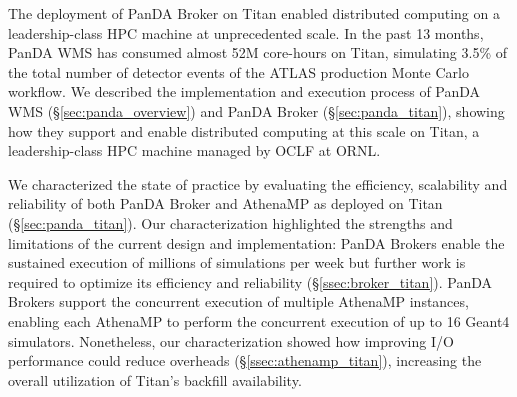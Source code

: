 
The deployment of PanDA Broker on Titan enabled distributed computing on a
leadership-class HPC machine at unprecedented scale. In the past 13 months,
PanDA WMS has consumed almost 52M core-hours on Titan, simulating 3.5\% of the
total number of detector events of the ATLAS production Monte Carlo workflow. We
described the implementation and execution process of PanDA WMS
(\S\ref{sec:panda_overview}) and PanDA Broker (\S\ref{sec:panda_titan}), showing
how they support and enable distributed computing at this scale on Titan, a
leadership-class HPC machine managed by OCLF at ORNL.

We characterized the state of practice by evaluating the efficiency, scalability
and reliability of both PanDA Broker and AthenaMP as deployed on Titan
(\S\ref{sec:panda_titan}). Our characterization highlighted the strengths
and limitations of the current design and implementation: PanDA Brokers enable
the sustained execution of millions of simulations per week but further work is
required to optimize its efficiency and reliability (\S\ref{ssec:broker_titan}).
PanDA Brokers support the concurrent execution of multiple AthenaMP instances,
enabling each AthenaMP to perform the concurrent execution of up to 16 Geant4
simulators. Nonetheless, our characterization showed how improving I/O
performance could reduce overheads (\S\ref{ssec:athenamp_titan}), increasing the
overall utilization of Titan's backfill availability.

